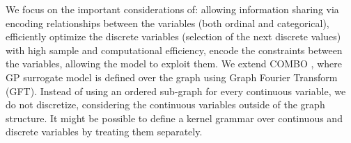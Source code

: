 \documentclass[
    american,a4paper
    ]{scrartcl}
\newcommand{\lang}{en}
\begin{document}
\begin{description}[style=unboxed]
            \item [\questionThree{\lang}]
                We focus on the important considerations of: allowing information sharing via encoding relationships between the variables (both ordinal and categorical),
                efficiently optimize the discrete variables (selection of the next discrete values) with high sample and computational efficiency,
                encode the constraints between the variables, allowing the model to exploit them. 
                We extend COMBO \cite{oh2019combinatorial}, where GP surrogate model is defined over the graph using Graph Fourier Transform (GFT).
                Instead of using an ordered sub-graph for every continuous variable, we do not discretize, considering the continuous variables outside of the graph structure.
                It might be possible to define a kernel grammar over continuous and discrete variables by treating them separately. 


\end{description}
\end{document}
